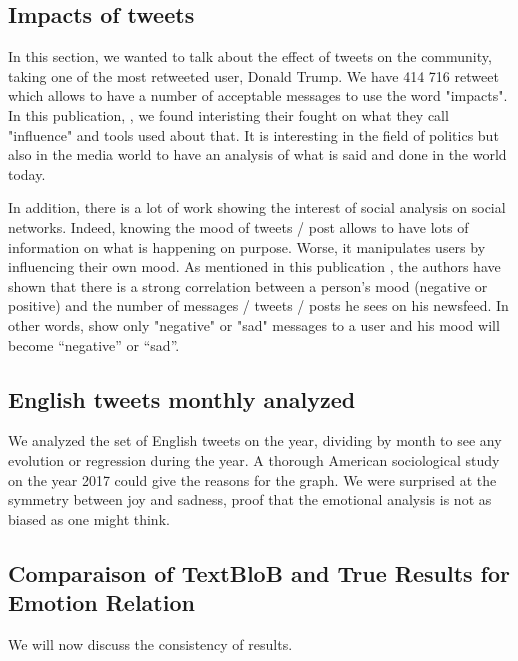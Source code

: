 \documentclass{acmtog} %
\begin{document}
\subsection{Impacts of tweets}
\label{subsub:impacts_tweets}

In this section, we wanted to talk about the effect of tweets on the community, taking one of the most retweeted user, Donald Trump. We have 414 716 retweet which allows to have a number of acceptable messages to use the word "impacts". In this publication, \cite{Vyas17}, we found interisting their fought on what they call "influence" and tools used about that. It is interesting in the field of politics but also in the media world to have an analysis of what is said and done in the world today.

In addition, there is a lot of work showing the interest of social analysis on social networks. Indeed, knowing the mood of tweets / post allows to have lots of information on what is happening on purpose. Worse, it manipulates users by influencing their own mood. As mentioned in this publication \cite{Yaosef2}, the authors have shown that there is a strong correlation between a person's mood (negative or positive) and the number of messages / tweets / posts he sees on his newsfeed. In other words, show only "negative" or "sad" messages to a user and his mood will become “negative” or “sad”.


\subsection{English tweets monthly analyzed}
\label{subsub:english_tweets_monthly}

We analyzed the set of English tweets on the year, dividing by month to see any evolution or regression during the year. A thorough American sociological study on the year 2017 could give the reasons for the graph. We were surprised at the symmetry between joy and sadness, proof that the emotional analysis is not as biased as one might think. 

\subsection{Comparaison of TextBloB and True Results for Emotion Relation}
\label{subsub:comparaisonEmotionRelation}

We will now discuss the consistency of results.
\end{document}
